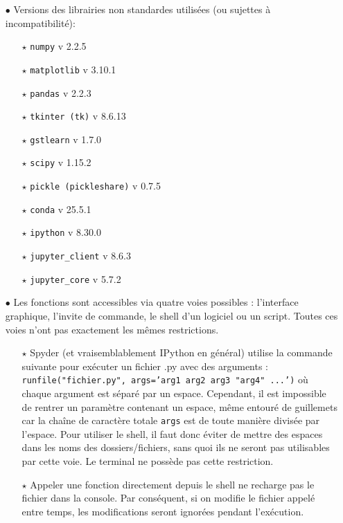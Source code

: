 \documentclass[12pt]{article}
\begin{document}
    \begin{enumerate}
        \item[$\bullet$] Versions des librairies non standardes utilisées (ou sujettes à incompatibilité):

        \begin{enumerate}
            \item[$\star$] \texttt{numpy} v 2.2.5
            \item[$\star$] \texttt{matplotlib} v 3.10.1
            \item[$\star$] \texttt{pandas} v 2.2.3
            \item[$\star$] \texttt{tkinter (tk)} v 8.6.13
            \item[$\star$] \texttt{gstlearn} v 1.7.0
            \item[$\star$] \texttt{scipy} v 1.15.2
            \item[$\star$] \texttt{pickle (pickleshare)} v 0.7.5
            \item[$\star$] \texttt{conda} v 25.5.1
            \item[$\star$] \texttt{ipython} v 8.30.0
            \item[$\star$] \texttt{jupyter_client} v 8.6.3
            \item[$\star$] \texttt{jupyter_core} v 5.7.2
        \end{enumerate}
    
        \item[$\bullet$] Les fonctions sont accessibles via quatre voies possibles : l'interface graphique, l'invite de commande, le shell d'un logiciel ou un script. Toutes ces voies n'ont pas exactement les mêmes restrictions.
        
        \begin{enumerate}
            \item[$\star$] Spyder (et vraisemblablement IPython en général) utilise la commande suivante pour exécuter un fichier .py avec des arguments : \texttt{runfile("fichier.py", args='arg1 arg2 arg3 "arg4" ...')} où chaque argument est séparé par un espace. Cependant, il est impossible de rentrer un paramètre contenant un espace, même entouré de guillemets car la chaîne de caractère totale \texttt{args} est de toute manière divisée par l'espace. Pour utiliser le shell, il faut donc éviter de mettre des espaces dans les noms des dossiers/fichiers, sans quoi ils ne seront pas utilisables par cette voie. Le terminal ne possède pas cette restriction.

            \item[$\star$] Appeler une fonction directement depuis le shell ne recharge pas le fichier dans la console. Par conséquent, si on modifie le fichier appelé entre temps, les modifications seront ignorées pendant l'exécution.
            

\end{enumerate}
\end{enumerate}
\end{document}
